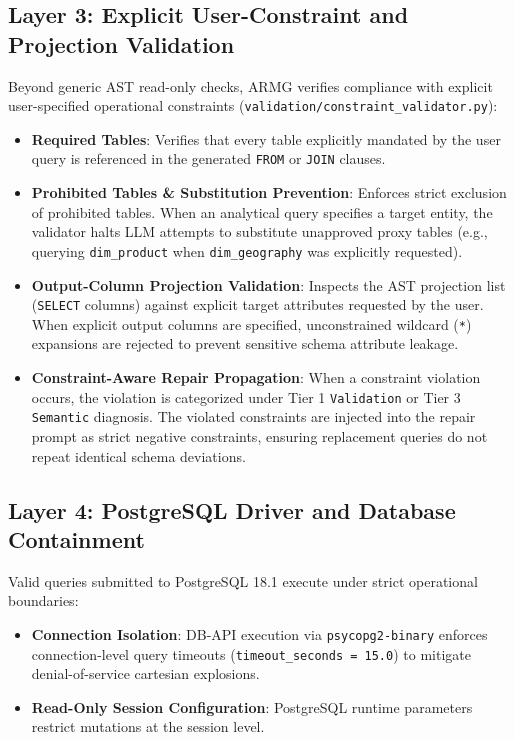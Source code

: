 \documentclass[conference]{IEEEtran}
\begin{document}
\subsection{Layer 3: Explicit User-Constraint and Projection Validation}
Beyond generic AST read-only checks, ARMG verifies compliance with explicit user-specified operational constraints (\texttt{validation/constraint\_validator.py}):
\begin{itemize}
    \item \textbf{Required Tables}: Verifies that every table explicitly mandated by the user query is referenced in the generated \texttt{FROM} or \texttt{JOIN} clauses.
    \item \textbf{Prohibited Tables \& Substitution Prevention}: Enforces strict exclusion of prohibited tables. When an analytical query specifies a target entity, the validator halts LLM attempts to substitute unapproved proxy tables (e.g., querying \texttt{dim\_product} when \texttt{dim\_geography} was explicitly requested).
    \item \textbf{Output-Column Projection Validation}: Inspects the AST projection list (\texttt{SELECT} columns) against explicit target attributes requested by the user. When explicit output columns are specified, unconstrained wildcard (\texttt{*}) expansions are rejected to prevent sensitive schema attribute leakage.
    \item \textbf{Constraint-Aware Repair Propagation}: When a constraint violation occurs, the violation is categorized under Tier 1 \texttt{Validation} or Tier 3 \texttt{Semantic} diagnosis. The violated constraints are injected into the repair prompt as strict negative constraints, ensuring replacement queries do not repeat identical schema deviations.
\end{itemize}

\subsection{Layer 4: PostgreSQL Driver and Database Containment}
Valid queries submitted to PostgreSQL 18.1 execute under strict operational boundaries:
\begin{itemize}
    \item \textbf{Connection Isolation}: DB-API execution via \texttt{psycopg2-binary} enforces connection-level query timeouts (\texttt{timeout\_seconds = 15.0}) to mitigate denial-of-service cartesian explosions.
    \item \textbf{Read-Only Session Configuration}: PostgreSQL runtime parameters restrict mutations at the session level.
\end{itemize}
\end{document}
